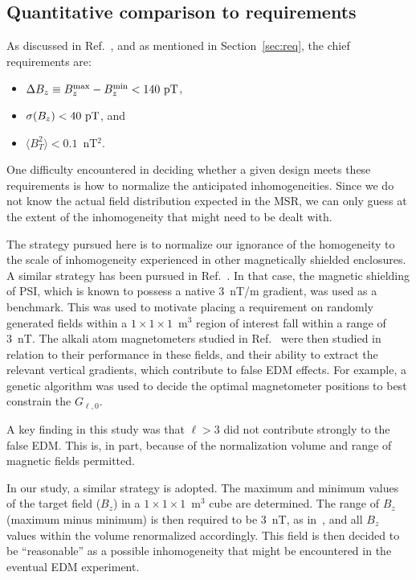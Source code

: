 \documentclass[preprint,12pt]{elsarticle}
\begin{document}
\subsection{Quantitative comparison to requirements}

As discussed in Ref.~\cite{bib:jeffnote}, and as mentioned in
Section~\ref{sec:req}, the chief requirements are:
\begin{itemize}
\item $\Delta B_z\equiv B_z^{\rm max}-B_z^{\rm min}<140~{\rm pT}$,
\item $\sigma(B_z)<40~{\rm pT}$, and
\item $\langle B_T^2\rangle<0.1$~nT$^2$.
\end{itemize}

One difficulty encountered in deciding whether a given design meets
these requirements is how to normalize the anticipated
inhomogeneities.  Since we do not know the actual field distribution
expected in the MSR, we can only guess at the extent of the
inhomogeneity that might need to be dealt with.

The strategy pursued here is to normalize our ignorance of the
homogeneity to the scale of inhomogeneity experienced in other
magnetically shielded enclosures.  A similar strategy has been pursued
in Ref.~\cite{bib:wkthesis}.  In that case, the magnetic shielding of
PSI, which is known to possess a native 3~nT/m gradient, was used as a
benchmark.  This was used to motivate placing a requirement on
randomly generated fields within a $1\times 1\times 1$~m$^3$ region of
interest fall within a range of 3~nT.  The alkali atom magnetometers
studied in Ref.~\cite{bib:wkthesis} were then studied in relation to
their performance in these fields, and their ability to extract the
relevant vertical gradients, which contribute to false EDM effects.
For example, a genetic algorithm was used to decide the optimal
magnetometer positions to best constrain the $G_{\ell,0}$.

A key finding in this study was that $\ell>3$ did not contribute
strongly to the false EDM.  This is, in part, because of the
normalization volume and range of magnetic fields permitted.

In our study, a similar strategy is adopted.  The maximum and minimum
values of the target field ($B_z$) in a $1\times 1\times 1$~m$^3$ cube
are determined.  The range of $B_z$ (maximum minus minimum) is then
required to be 3~nT, as in~\cite{bib:wkthesis}, and all $B_z$ values
within the volume renormalized accordingly.  This field is then
decided to be ``reasonable'' as a possible inhomogeneity that might be
encountered in the eventual EDM experiment.
\end{document}
